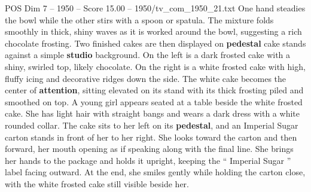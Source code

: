 \begin{textsample}{POS Dim 7 – 1950 – Score 15.00 – 1950/tv\_com\_1950\_21.txt}
One hand steadies the bowl while the other stirs with a spoon or spatula.
The mixture folds smoothly in thick, shiny waves as it is worked around the bowl, suggesting a rich chocolate frosting.
Two finished cakes are then displayed on \textbf{pedestal} cake stands against a simple \textbf{studio} background.
On the left is a dark frosted cake with a shiny, swirled top, likely chocolate.
On the right is a white frosted cake with high, fluffy icing and decorative ridges down the side.
The white cake becomes the center of \textbf{attention}, sitting elevated on its stand with its thick frosting piled and smoothed on top.
A young girl appears seated at a table beside the white frosted cake.
She has light hair with straight bangs and wears a dark dress with a white rounded collar.
The cake sits to her left on its \textbf{pedestal}, and an Imperial Sugar carton stands in front of her to her right.
She looks toward the carton and then forward, her mouth opening as if speaking along with the final line.
She brings her hands to the package and holds it upright, keeping the “ Imperial Sugar ” label facing outward.
At the end, she smiles gently while holding the carton close, with the white frosted cake still visible beside her.

\end{textsample}
